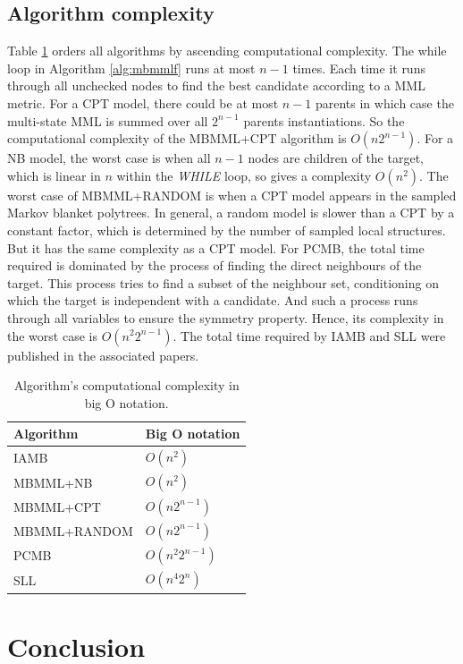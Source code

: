 \subsection{Algorithm complexity}
Table \ref{tb:bigo} orders all algorithms by ascending computational complexity. The while loop in Algorithm \ref{alg:mbmmlf} runs at most $n-1$ times. Each time it runs through all unchecked nodes to find the best candidate according to a MML metric. For a CPT model, there could be at most $n-1$ parents in which case the multi-state MML is summed over all $2^{n-1}$ parents instantiations. So the computational complexity of the MBMML+CPT algorithm is $O(n2^{n-1})$. For a NB model, the worst case is when all $n-1$ nodes are children of the target, which is linear in $n$ within the \textit{WHILE} loop, so gives a complexity $O(n^2)$. The worst case of MBMML+RANDOM is when a CPT model appears in the sampled Markov blanket polytrees. In general, a random model is slower than a CPT by a constant factor, which is determined by the number of sampled local structures. But it has the same complexity as a CPT model. For PCMB, the total time required is dominated by the process of finding the direct neighbours of the target. This process tries to find a subset of the neighbour set, conditioning on which the target is independent with a candidate. And such a process runs through all variables to ensure the symmetry property. Hence, its complexity in the worst case is $O(n^2 2^{n-1})$. The total time required by IAMB and SLL were published in the associated papers. 
\begin{table}[]
\centering
\caption{Algorithm's computational complexity in big O notation.}
\label{tb:bigo}
\begin{tabular}{ll}
\hline
Algorithm    & Big O notation \\ \hline
IAMB      & $O(n^2)$      \\
MBMML+NB          &    $O(n^2)$    \\
MBMML+CPT          &   $O(n2^{n-1})$      \\
MBMML+RANDOM         & $O(n2^{n-1})$        \\
PCMB & $O(n^2 2^{n-1})$     \\
SLL        & $O(n^4 2^n)$       \\ \hline 
\end{tabular}
\end{table}


\section{Conclusion}
\label{sec:disc}


